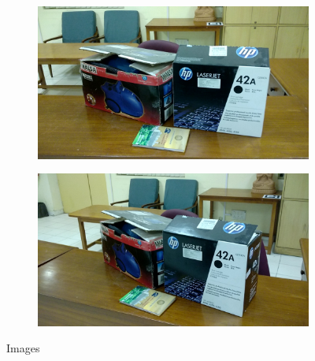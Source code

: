 \documentclass{article}
\begin{document}
\begin{enumerate}
\begin{figure}[H]
\begin{subfigure}{.33\textwidth}
					  	\caption{}\label{fig:sub1}
					\end{subfigure}%
					\begin{subfigure}{.33\textwidth}
					  	\centering
					  	\includegraphics[width=1.0\linewidth]{1_4_image.jpg}
					  	\caption{}\label{fig:sub2}
					\end{subfigure}
					\begin{subfigure}{.33\textwidth}
					  	\centering
					  	\includegraphics[width=1.0\linewidth]{1_5_image.jpg}
					  	\caption{}\label{fig:sub2}
					\end{subfigure}
					\caption{Images}
		\end{figure}
		\begin{figure}[H]
					\begin{subfigure}{\textwidth}
					  	\centering

\end{subfigure}
\end{figure}
\end{enumerate}
\end{document}
